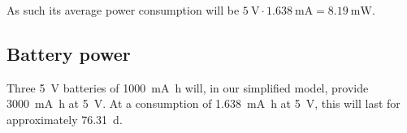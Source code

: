 \documentclass[a4paper]{scrreprt}
\begin{document}
As such its average power consumption will be $\SI{5}{\V} \cdot \SI{1.638}{\mA}
= \SI{8.19}{\mW}$.

\subsection{Battery power}

Three \SI{5}{\V} batteries of \SI{1000}{\milli\ampere\hour} will, in our
simplified model, provide \SI{3000}{\milli\ampere\hour} at \SI{5}{\V}. At a
consumption of \SI{1.638}{\milli\ampere\hour} at \SI{5}{\V}, this will last for
approximately \SI{76.31}{\day}.
\end{document}
